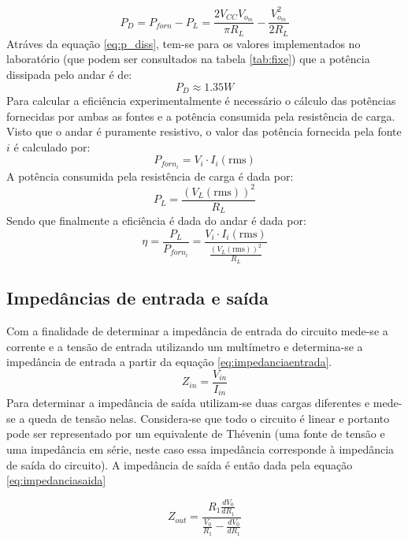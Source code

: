 \documentclass[%
  reprint,
  nofootinbib,
  amsmath,amssymb,
  aps,
  10pt,
  a4paper
]{revtex4-1}
\begin{document}
\begin{equation}
P_D=P_{forn}-P_L=\frac{2V_{CC}V_{o_m}}{\pi R_L}-\frac{V_{o_m}^2}{2R_L}
\label{eq:p_diss}
\end{equation}
Atráves da equação \ref{eq:p_diss}, tem-se para os valores implementados no laboratório (que podem ser consultados na tabela \ref{tab:fixe}) que a potência dissipada pelo andar é de:
\begin{equation}
P_D\approx1.35 W
\end{equation}
Para calcular a eficiência experimentalmente é necessário o cálculo das potências fornecidas por ambas as fontes e a potência consumida pela resistência de carga. Visto que o andar é puramente resistivo, o valor das potência fornecida pela fonte $i$ é calculado por:
\begin{equation}
P_{forn_i}=V_i \cdot I_i(\mathrm{rms})
\end{equation}
A potência consumida pela resistência de carga é dada por:
\begin{equation}
P_L=\frac{(V_L(\mathrm{rms}))^2}{R_L}
\end{equation}
Sendo que finalmente a eficiência é dada do andar é dada por:
\begin{equation}
\eta=\frac{P_L}{P_{forn_i}}=\frac{V_i \cdot I_i(\mathrm{rms})}{\frac{(V_L(\mathrm{rms}))^2}{R_L}}
\end{equation}

\subsection{Impedâncias de entrada e saída}
Com a finalidade de determinar a impedância de entrada do circuito mede-se a corrente e a tensão de entrada utilizando um multímetro e determina-se a impedância de entrada a partir da equação \ref{eq:impedanciaentrada}.
\begin{equation}
Z_{in}=\frac{V_{in}}{I_{in}}
\label{eq:impedanciaentrada}
\end{equation}
Para determinar a impedância de saída utilizam-se duas cargas diferentes e mede-se a queda de tensão nelas. Considera-se que todo o circuito é linear e portanto pode ser representado por um equivalente de Thévenin (uma fonte de tensão e uma impedância em série, neste caso essa impedância corresponde à impedância de saída do circuito). A impedância de saída é então dada pela equação \ref{eq:impedanciasaida}

\begin{equation}
Z_{out}=\frac{R_1 \frac{dV_0}{dR_1}}{\frac{V_0}{R_1}-\frac{dV_0}{dR_1}}
\label{eq:impedanciasaida}
\end{equation}
\end{document}
